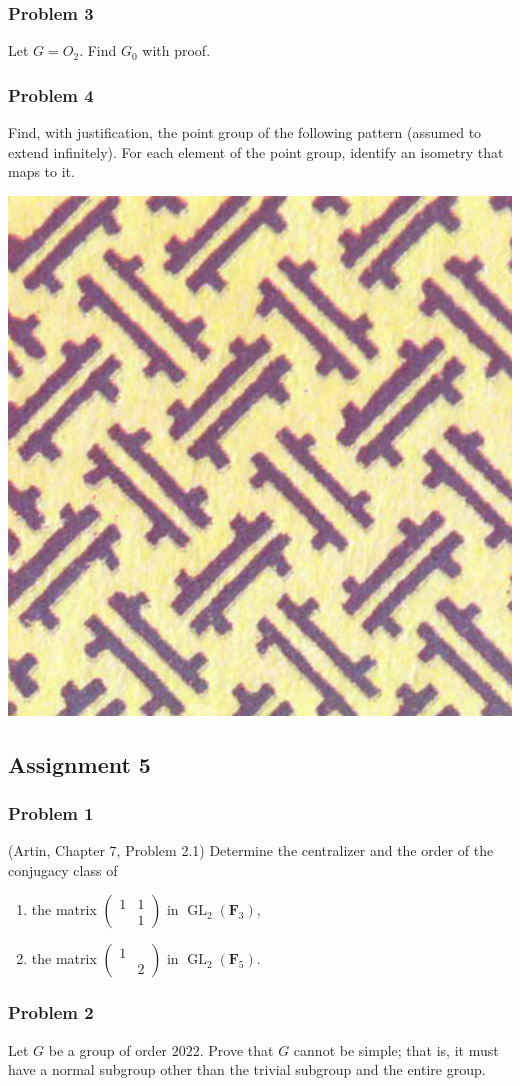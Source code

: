 \documentclass[11pt]{article}
\begin{document}
\subsubsection*{Problem 3}
\label{sec:orgc215fac}
Let \(G = O_2\).
Find \(G_0\) with proof.

\subsubsection*{Problem 4}
\label{sec:orgde52f5c}
Find, with justification, the point group of the following pattern (assumed to extend infinitely).
For each element of the point group, identify an isometry that maps to it.

\begin{center}
\includegraphics[width=.25\textwidth]{assets/Homework/2022-08-17_12-47-43_screenshot.png}
\end{center}

\subsection*{Assignment 5}
\label{sec:org74147f5}
\subsubsection*{Problem 1}
\label{sec:org18d6b7c}
(Artin, Chapter 7, Problem 2.1)
Determine the centralizer and the order of the conjugacy class of
\begin{enumerate}
\item the matrix \(\begin{pmatrix}1 & 1 \\ & 1 \end{pmatrix}\) in \(\operatorname{GL}_2(\mathbf{F}_3),\)
\item the matrix \(\begin{pmatrix}1 &  \\ & 2 \end{pmatrix}\) in \(\operatorname{GL}_2(\mathbf{F}_5).\)
\end{enumerate}

\subsubsection*{Problem 2}
\label{sec:org67f5399}
Let \(G\) be a group of order \(2022\).
Prove that \(G\) cannot be simple; that is, it must have a normal subgroup other than the trivial subgroup and the entire group.
\end{document}
